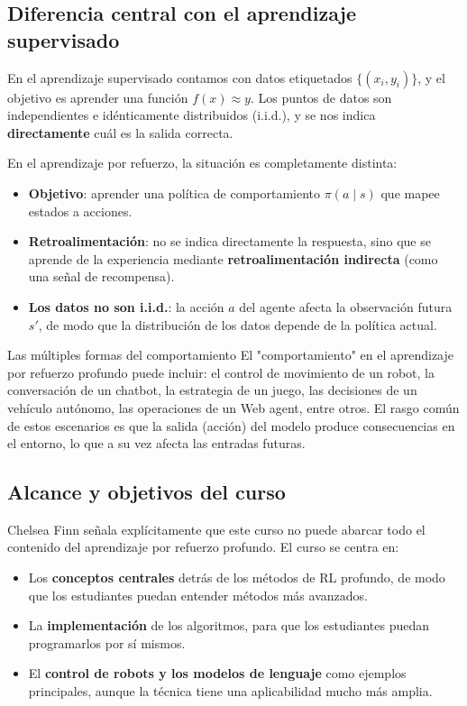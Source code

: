 \documentclass[a4paper]{article}
\begin{document}
\subsection{Diferencia central con el aprendizaje supervisado}

En el aprendizaje supervisado contamos con datos etiquetados $\{(x_i, y_i)\}$, y el objetivo es aprender una función $f(x) \approx y$. Los puntos de datos son independientes e idénticamente distribuidos (i.i.d.), y se nos indica \textbf{directamente} cuál es la salida correcta.

En el aprendizaje por refuerzo, la situación es completamente distinta:

\begin{itemize}
    \item \textbf{Objetivo}: aprender una política de comportamiento $\pi(a \mid s)$ que mapee estados a acciones.
    \item \textbf{Retroalimentación}: no se indica directamente la respuesta, sino que se aprende de la experiencia mediante \textbf{retroalimentación indirecta} (como una señal de recompensa).
    \item \textbf{Los datos no son i.i.d.}: la acción $a$ del agente afecta la observación futura $s'$, de modo que la distribución de los datos depende de la política actual.
\end{itemize}

\begin{knowledgebox}{Las múltiples formas del comportamiento}
El "comportamiento" en el aprendizaje por refuerzo profundo puede incluir: el control de movimiento de un robot, la conversación de un chatbot, la estrategia de un juego, las decisiones de un vehículo autónomo, las operaciones de un Web agent, entre otros. El rasgo común de estos escenarios es que la salida (acción) del modelo produce consecuencias en el entorno, lo que a su vez afecta las entradas futuras.
\end{knowledgebox}

\subsection{Alcance y objetivos del curso}

Chelsea Finn señala explícitamente que este curso no puede abarcar todo el contenido del aprendizaje por refuerzo profundo. El curso se centra en:
\begin{itemize}
    \item Los \textbf{conceptos centrales} detrás de los métodos de RL profundo, de modo que los estudiantes puedan entender métodos más avanzados.
    \item La \textbf{implementación} de los algoritmos, para que los estudiantes puedan programarlos por sí mismos.
    \item El \textbf{control de robots y los modelos de lenguaje} como ejemplos principales, aunque la técnica tiene una aplicabilidad mucho más amplia.
\end{itemize}
\end{document}
